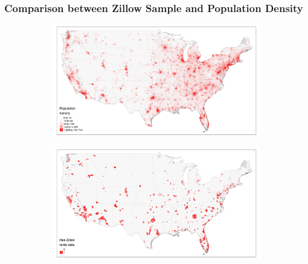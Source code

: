 \documentclass[aspectratio=169, t]{beamer}
\begin{document}
\begin{frame}[label = zillow_pop_density]
    \frametitle{Comparison between Zillow Sample and Population Density}
    \begin{figure}
        \centering
    \vspace{10mm}
    \hspace{-23mm}
        \begin{subfigure}{0.41\textwidth}
            \includegraphics[scale = 0.33]{maps_US/output/USPS_zipcodes_pop_density.png}
        \end{subfigure}%
    \quad\quad\quad\quad\quad\quad
        \begin{subfigure}{0.41\textwidth}
            \includegraphics[scale = 0.33]{maps_US/output/USPS_zipcodes_zillow_data.png}
        \end{subfigure}
    \end{figure}
    \hyperlink{zillow_data}{}
\end{frame}
\end{document}
